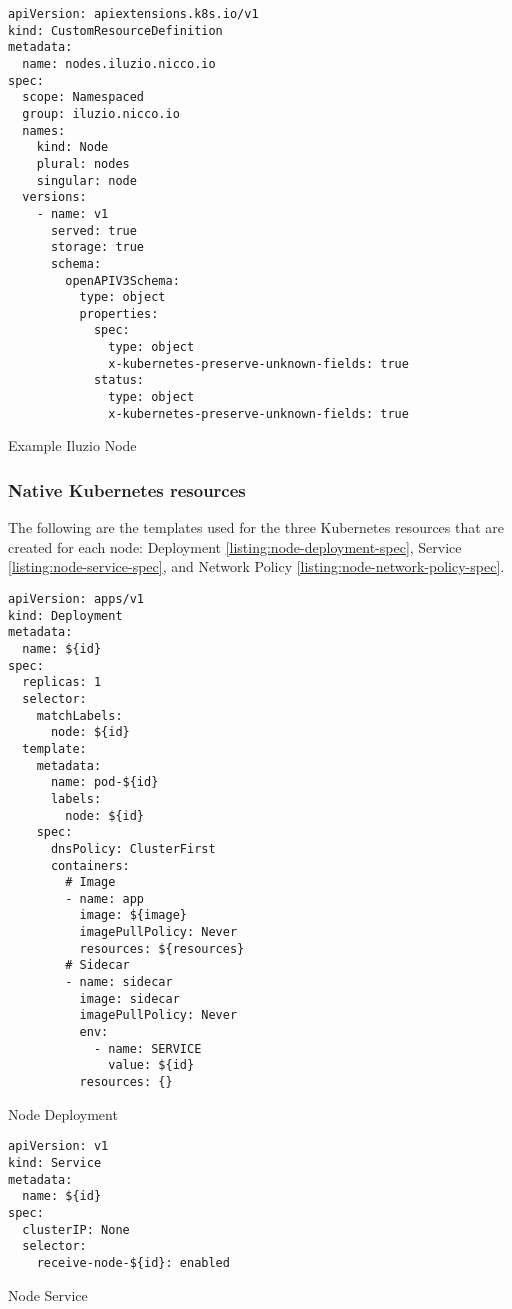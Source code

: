 \begin{listing}[H]
  \begin{verbatim}
apiVersion: apiextensions.k8s.io/v1
kind: CustomResourceDefinition
metadata:
  name: nodes.iluzio.nicco.io
spec:
  scope: Namespaced
  group: iluzio.nicco.io
  names:
    kind: Node
    plural: nodes
    singular: node
  versions:
    - name: v1
      served: true
      storage: true
      schema:
        openAPIV3Schema:
          type: object
          properties:
            spec:
              type: object
              x-kubernetes-preserve-unknown-fields: true
            status:
              type: object
              x-kubernetes-preserve-unknown-fields: true
  \end{verbatim}
  \caption{Example Iluzio Node}
  \label{listing:node-spec-crd}
\end{listing}

\subsubsection{Native Kubernetes resources}

The following are the templates used for the three Kubernetes resources that are created for each node: Deployment \ref{listing:node-deployment-spec}, Service \ref{listing:node-service-spec}, and Network Policy \ref{listing:node-network-policy-spec}.

\begin{listing}[H]
  \begin{verbatim}
apiVersion: apps/v1
kind: Deployment
metadata:
  name: ${id}
spec:
  replicas: 1
  selector:
    matchLabels:
      node: ${id}
  template:
    metadata:
      name: pod-${id}
      labels:
        node: ${id}
    spec:
      dnsPolicy: ClusterFirst
      containers:
        # Image
        - name: app
          image: ${image}
          imagePullPolicy: Never
          resources: ${resources}
        # Sidecar
        - name: sidecar
          image: sidecar
          imagePullPolicy: Never
          env:
            - name: SERVICE
              value: ${id}
          resources: {}
\end{verbatim}
  \caption{Node Deployment}
  \label{listing:node-deployment-spec}
\end{listing}

\begin{listing}[H]
  \begin{verbatim}
apiVersion: v1
kind: Service
metadata:
  name: ${id}
spec:
  clusterIP: None
  selector:
    receive-node-${id}: enabled
  \end{verbatim}
  \caption{Node Service}
  \label{listing:node-service-spec}
\end{listing}

